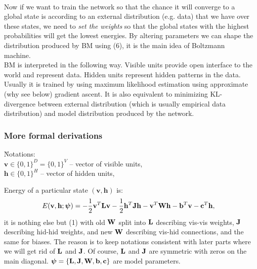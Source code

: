 \\[1em]
Now if we want to train the network so that the chance it will converge to a global state is according to an external distribution (e.g. data) that we have over these states, we need to \emph{set the weights} so that the global states with the highest probabilities will get the lowest energies. By altering parameters we can shape the distribution produced by BM using (6), it is the main idea of Boltzmann machine.
\\[1em]
BM is interpreted in the following way. Visible units provide open interface to the world and represent data. Hidden units represent hidden patterns in the data. Usually it is trained by using maximum likelihood estimation using approximate (why see below) gradient ascent. It is also equivalent \cite{goodfellow2016deep} to minimizing KL-divergence between external distribution (which is usually empirical data distribution) and model distribution produced by the network.

\subsubsection{More formal derivations}
\u{Notations}:
\\$\mathbf{v}\in\{0,1\}^D=\{0,1\}^V$ -- vector of visible units,
\\$\mathbf{h}\in\{0,1\}^H$ -- vector of hidden units,

Energy of a particular state $(\mathbf{v},\mathbf{h})$ is:
\begin{gather}
E(\mathbf{v},\mathbf{h};\boldsymbol{\psi})=-\frac{1}{2}\mathbf{v}^T\mathbf{L}\mathbf{v}-\frac{1}{2}\mathbf{h}^T\mathbf{J}\mathbf{h}-\mathbf{v}^T\mathbf{W}\mathbf{h}-\mathbf{b}^T\mathbf{v}-\mathbf{c}^T\mathbf{h},
\end{gather}
it is nothing else but (1) with old $\mathbf{W}$ split into $\mathbf{L}$ describing vis-vis weights, $\mathbf{J}$ describing hid-hid weights, and new $\mathbf{W}$ describing vis-hid connections, and the same for biases. The reason is to keep notations consistent with later parts where we will get rid of $\mathbf{L}$ and $\mathbf{J}$. Of course, $\mathbf{L}$ and $\mathbf{J}$ are symmetric with zeros on the main diagonal. $\boldsymbol{\psi}=\{\mathbf{L},\mathbf{J},\mathbf{W},\mathbf{b},\mathbf{c}\}$ are model parameters.

